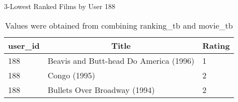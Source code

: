 \begin{table}[!htbp]
	\caption{3-Lowest Ranked Films by User 188} \label{tab:lowest-188}
	\begin{center}
	\vspace{-5mm}
		\begin{tabular}{ l l l }
			\hline
			\multicolumn{1}{c}{user\_id} & \multicolumn{1}{c}{Title} & \multicolumn{1}{c}{Rating}\\
			\hline
     		188 & Beavis and Butt-head Do America (1996)  &      1\\
     		188 & Congo (1995)                            &      2\\
     		188 & Bullets Over Broadway (1994)            &      2\\
			\hline
		\end{tabular}
	\caption*{\scriptsize Values were obtained from combining ranking\_tb and movie\_tb}
	 \end{center}
\end{table}